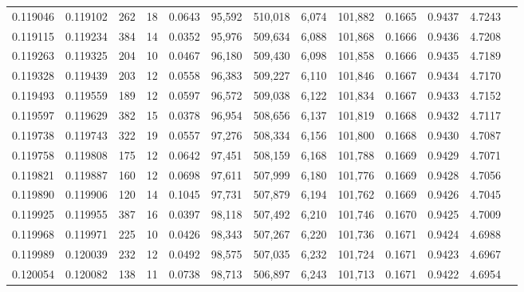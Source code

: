 \begin{tabular}{rrrrrrrrrrrrr}
0.119046 & 0.119102 &   262 &  18 &                                     0.0643 &  95,592 & 510,018 &   6,074 & 101,882 & 0.1665 & 0.9437 & 4.7243 \\
0.119115 & 0.119234 &   384 &  14 &                                     0.0352 &  95,976 & 509,634 &   6,088 & 101,868 & 0.1666 & 0.9436 & 4.7208 \\
0.119263 & 0.119325 &   204 &  10 &                                     0.0467 &  96,180 & 509,430 &   6,098 & 101,858 & 0.1666 & 0.9435 & 4.7189 \\
0.119328 & 0.119439 &   203 &  12 &                                     0.0558 &  96,383 & 509,227 &   6,110 & 101,846 & 0.1667 & 0.9434 & 4.7170 \\
0.119493 & 0.119559 &   189 &  12 &                                     0.0597 &  96,572 & 509,038 &   6,122 & 101,834 & 0.1667 & 0.9433 & 4.7152 \\
0.119597 & 0.119629 &   382 &  15 &                                     0.0378 &  96,954 & 508,656 &   6,137 & 101,819 & 0.1668 & 0.9432 & 4.7117 \\
0.119738 & 0.119743 &   322 &  19 &                                     0.0557 &  97,276 & 508,334 &   6,156 & 101,800 & 0.1668 & 0.9430 & 4.7087 \\
0.119758 & 0.119808 &   175 &  12 &                                     0.0642 &  97,451 & 508,159 &   6,168 & 101,788 & 0.1669 & 0.9429 & 4.7071 \\
0.119821 & 0.119887 &   160 &  12 &                                     0.0698 &  97,611 & 507,999 &   6,180 & 101,776 & 0.1669 & 0.9428 & 4.7056 \\
0.119890 & 0.119906 &   120 &  14 &                                     0.1045 &  97,731 & 507,879 &   6,194 & 101,762 & 0.1669 & 0.9426 & 4.7045 \\
0.119925 & 0.119955 &   387 &  16 &                                     0.0397 &  98,118 & 507,492 &   6,210 & 101,746 & 0.1670 & 0.9425 & 4.7009 \\
0.119968 & 0.119971 &   225 &  10 &                                     0.0426 &  98,343 & 507,267 &   6,220 & 101,736 & 0.1671 & 0.9424 & 4.6988 \\
0.119989 & 0.120039 &   232 &  12 &                                     0.0492 &  98,575 & 507,035 &   6,232 & 101,724 & 0.1671 & 0.9423 & 4.6967 \\
0.120054 & 0.120082 &   138 &  11 &                                     0.0738 &  98,713 & 506,897 &   6,243 & 101,713 & 0.1671 & 0.9422 & 4.6954 \\

\end{tabular}
